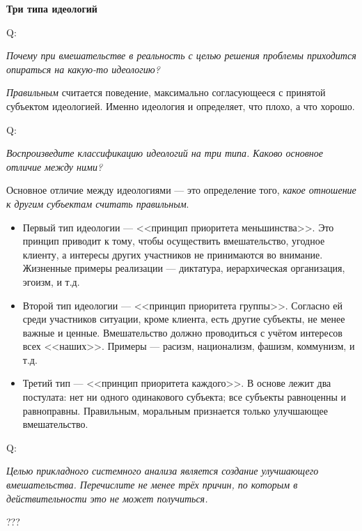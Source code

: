 \documentclass{article}
\newcommand{\note}[1]{\textit{#1}}
\renewcommand{\subsection}[1]{
	\vspace{2em}
	\begin{flushright}
		\large
		\textbf{#1}
	\end{flushright}
	}
\newcommand{\question}[2]{
	\begin{flushright}
		Q:\hspace{2ex}\vline\hspace{2ex}
		\begin{minipage}{0.9\textwidth}
			\large
			\textit{#1}
		\end{minipage}
	\end{flushright}
	\begin{center}
		\begin{minipage}{0.95\textwidth}
			#2
		\end{minipage}
	\end{center}
	}
\begin{document}
\subsection{Три типа идеологий}
\question{Почему при вмешательстве в реальность с целью решения проблемы приходится опираться на какую-то идеологию?}{\note{Правильным} считается поведение, максимально согласующееся с принятой субъектом идеологией. Именно идеология и определяет, что плохо, а что хорошо.}
\question{Воспроизведите классификацию идеологий на три типа. Каково основное отличие между ними?}{Основное отличие между идеологиями --- это определение того, \note{какое отношение к другим субъектам считать правильным}.
\begin{itemize}
	\item Первый тип идеологии --- <<принцип приоритета меньшинства>>. Это принцип приводит к тому, чтобы осуществить вмешательство, угодное клиенту, а интересы других участников не принимаются во внимание. Жизненные примеры реализации --- диктатура, иерархическая организация, эгоизм, и т.д.
	\item Второй тип идеологии --- <<принцип приоритета группы>>. Согласно ей среди участников ситуации, кроме клиента, есть другие субъекты, не менее важные и ценные. Вмешательство должно проводиться с учётом интересов всех <<наших>>. Примеры --- расизм, национализм, фашизм, коммунизм, и т.д.
	\item Третий тип --- <<принцип приоритета каждого>>. В основе лежит два постулата: нет ни одного одинакового субъекта; все субъекты равноценны и равноправны. Правильным, моральным признается только улучшающее вмешательство.
\end{itemize}}
\question{Целью прикладного системного анализа является создание улучшающего вмешательства. Перечислите не менее трёх причин, по которым в действительности это не может получиться.}{???}
\end{document}
